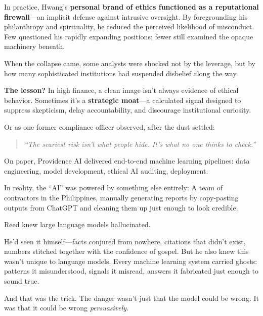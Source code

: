 \begin{tcolorbox}[colback=blue!5!white, colframe=blue!50!black, breakable, title={Historical Sidebar: Bill Hwang, Archegos, and the Ethics Firewall}]
    \medskip
    
    In practice, Hwang’s \textbf{personal brand of ethics functioned as a reputational firewall}—an implicit defense against intrusive oversight.  
    By foregrounding his philanthropy and spirituality, he reduced the perceived likelihood of misconduct. Few questioned his rapidly expanding positions; fewer still examined the opaque machinery beneath.
    
    \medskip
    
    When the collapse came, some analysts were shocked not by the leverage, but by how many sophisticated institutions had suspended disbelief along the way.
    
    \medskip
    
    \textbf{The lesson?} In high finance, a clean image isn’t always evidence of ethical behavior. Sometimes it’s a \textbf{strategic moat}—a calculated signal designed to suppress skepticism, delay accountability, and discourage institutional curiosity.
    
    \medskip
    
    Or as one former compliance officer observed, after the dust settled:
    
    \begin{quote}
    \textit{“The scariest risk isn’t what people hide.  
    It’s what no one thinks to check.”}
    \end{quote}
\end{tcolorbox}

\medskip
    

On paper, Providence AI\texttrademark{} delivered end-to-end machine learning pipelines: data engineering, model development, ethical AI auditing, deployment.

In reality, the “AI\texttrademark{}” was powered by something else entirely:  
A team of contractors in the Philippines, manually generating reports by copy-pasting outputs from ChatGPT and cleaning them up just enough to look credible.

Reed knew large language models hallucinated.

He’d seen it himself—facts conjured from nowhere, citations that didn’t exist, numbers stitched together with the confidence of gospel. But he also knew this wasn’t unique to language models. Every machine learning system carried ghosts: patterns it misunderstood, signals it misread, answers it fabricated just enough to sound true.

And that was the trick.  
The danger wasn’t just that the model could be wrong.  
It was that it could be wrong \textit{persuasively}.

